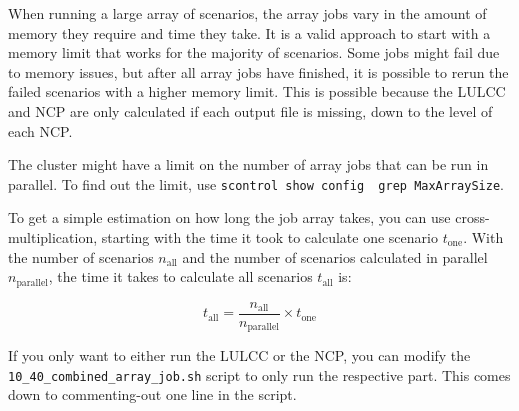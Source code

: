 \documentclass[
  letterpaper,
  DIV=11,
  numbers=noendperiod]{scrreprt}
\newcounter{quartocallouttipno}
\newcommand{\quartocallouttip}[1]{\refstepcounter{quartocallouttipno}\label{#1}}
\begin{document}
When running a large array of scenarios, the array jobs vary in the
amount of memory they require and time they take. It is a valid approach
to start with a memory limit that works for the majority of scenarios.
Some jobs might fail due to memory issues, but after all array jobs have
finished, it is possible to rerun the failed scenarios with a higher
memory limit. This is possible because the LULCC and NCP are only
calculated if each output file is missing, down to the level of each
NCP.

\begin{tcolorbox}[enhanced jigsaw, breakable, bottomrule=.15mm, toprule=.15mm, rightrule=.15mm, opacitybacktitle=0.6, title=\textcolor{quarto-callout-note-color}{\faInfo}\hspace{0.5em}{Note}, coltitle=black, colback=white, titlerule=0mm, toptitle=1mm, left=2mm, bottomtitle=1mm, colbacktitle=quarto-callout-note-color!10!white, colframe=quarto-callout-note-color-frame, opacityback=0, leftrule=.75mm, arc=.35mm]

The cluster might have a limit on the number of array jobs that can be
run in parallel. To find out the limit, use
\texttt{scontrol\ show\ config\ \textbar{}\ grep\ MaxArraySize}.

\end{tcolorbox}

To get a simple estimation on how long the job array takes, you can use
cross-multiplication, starting with the time it took to calculate one
scenario \(t_{\text{one}}\). With the number of scenarios
\(n_{\text{all}}\) and the number of scenarios calculated in parallel
\(n_{\text{parallel}}\), the time it takes to calculate all scenarios
\(t_{\text{all}}\) is:

\[
t_{\text{all}} = \frac{n_{\text{all}}}{n_{\text{parallel}}} \times t_{\text{one}}
\]

\begin{tcolorbox}[enhanced jigsaw, breakable, bottomrule=.15mm, toprule=.15mm, rightrule=.15mm, opacitybacktitle=0.6, title=\textcolor{quarto-callout-tip-color}{\faLightbulb}\hspace{0.5em}{Tip \ref*{tip-parallel}: Selective running}, coltitle=black, colback=white, titlerule=0mm, toptitle=1mm, left=2mm, bottomtitle=1mm, colbacktitle=quarto-callout-tip-color!10!white, colframe=quarto-callout-tip-color-frame, opacityback=0, leftrule=.75mm, arc=.35mm]

\quartocallouttip{tip-parallel} 

If you only want to either run the LULCC or the NCP, you can modify the
\texttt{10\_40\_combined\_array\_job.sh} script to only run the
respective part. This comes down to commenting-out one line in the
script.

\end{tcolorbox}
\end{document}
